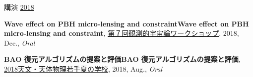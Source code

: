 \begin{rSection}{講演}
\underline{2018}
\begin{etaremune}
\setcounter{enumi}{3}
\item \textbf{Wave effect on PBH micro-lensing and constraintWave effect on PBH micro-lensing and constraint}, \href{http://web.cc.yamaguchi-u.ac.jp/~rsaito/obscosmo2018/}{第７回観測的宇宙論ワークショップ}, 2018, Dec., \textit{Oral}
\item \textbf{BAO 復元アルゴリズムの提案と評価BAO 復元アルゴリズムの提案と評価}, \href{http://www.astro-wakate.org/ss2018/web/link.html}{2018天文・天体物理若手夏の学校}, 2018, Aug., \textit{Oral}
\end{etaremune}\end{rSection}
